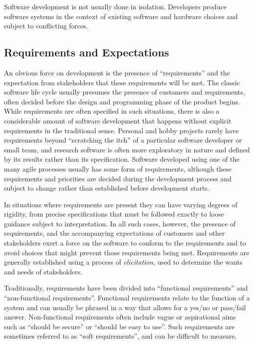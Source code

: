 Software development is not usually done in isolation. Developers produce software systems in the context of existing software and hardware choices and subject to conflicting forces.

\subsection{Requirements and Expectations}
\label{software:requirements}

An obvious force on development is the presence of \enquote{requirements} and the expectation from stakeholders that these requirements will be met. The classic software life cycle usually presumes the presence of customers and requirements, often decided before the design and programming phase of the product begins. While requirements are often specified in such situations, there is also a considerable amount of software development that happens without explicit requirements in the traditional sense. Personal and hobby projects rarely have requirements beyond \enquote{scratching the itch} \citep{Raymond2010} of a particular software developer or small team, and research software is often more exploratory in nature and defined by its results rather than its specification. Software developed using one of the many agile processes \citep{Hoda2017} usually has some form of requirements, although these requirements and priorities are decided during the development process and subject to change rather than established before development starts.

In situations where requirements are present they can have varying degrees of rigidity, from precise specifications that must be followed exactly to loose guidance subject to interpretation. In all such cases, however, the presence of requirements, and the accompanying expectations of customers and other stakeholders exert a force on the software to conform to the requirements and to avoid choices that might prevent those requirements being met. Requirements are generally established using a process of \emph{elicitation}, used to determine the wants and needs of stakeholders.

\label{A34}
Traditionally, requirements have been divided into \enquote{\gls{functional requirements}} and \enquote{\gls{non-functional requirements}}. Functional requirements relate to the function of a system and can usually be phrased in a way that allows for a yes/no or pass/fail answer. Non-functional requirements often include vague or aspirational aims such as \enquote{should be secure} or \enquote{should be easy to use}. Such requirements  are sometimes referred to as \enquote{\gls{soft requirements}}, and can be difficult to measure.

